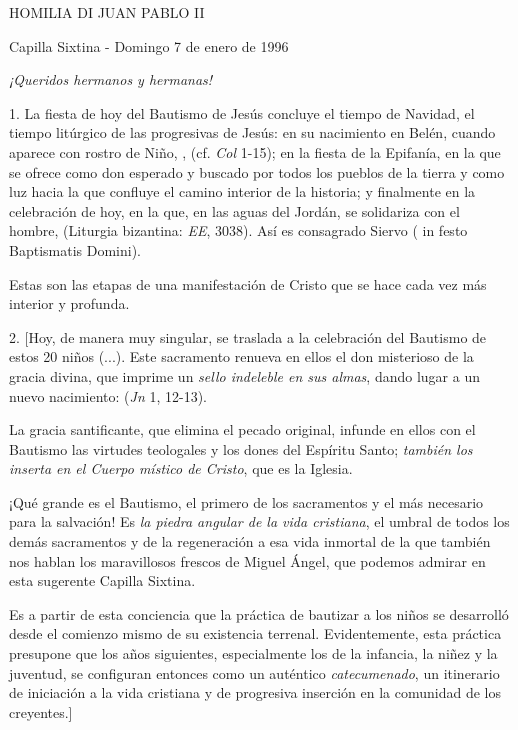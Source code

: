 \begin{body}
	HOMILIA DI JUAN PABLO II
	
	Capilla Sixtina - Domingo 7 de enero de 1996
	
	\emph{¡Queridos hermanos y hermanas!}
	
	1. La fiesta de hoy del Bautismo de Jesús concluye el tiempo de Navidad, el tiempo litúrgico de las progresivas  de Jesús: en su nacimiento en Belén, cuando aparece con rostro de Niño, ,  (cf. \emph{Col} 1-15); en la fiesta de la Epifanía, en la que se ofrece como don esperado y buscado por todos los pueblos de la tierra y como luz hacia la que confluye el camino interior de la historia; y finalmente en la celebración de hoy, en la que, en las aguas del Jordán, se solidariza con el hombre,  (Liturgia bizantina: \emph{EE}, 3038). Así es consagrado Siervo  ( in festo Baptismatis Domini).
	
	Estas son las etapas de una manifestación de Cristo que se hace cada vez más interior y profunda.
	
	2. {[}Hoy, de manera muy singular, se traslada a la celebración del Bautismo de estos 20 niños (...). Este sacramento renueva en ellos el don misterioso de la gracia divina, que imprime un \emph{sello indeleble en sus almas}, dando lugar a un nuevo nacimiento:  (\emph{Jn} 1, 12-13).
	
	La gracia santificante, que elimina el pecado original, infunde en ellos con el Bautismo las virtudes teologales y los dones del Espíritu Santo; \emph{también los inserta en el Cuerpo místico de Cristo}, que es la Iglesia.
	
	¡Qué grande es el Bautismo, el primero de los sacramentos y el más necesario para la salvación! Es \emph{la piedra angular de la vida cristiana}, el umbral de todos los demás sacramentos y de la regeneración a esa vida inmortal de la que también nos hablan los maravillosos frescos de Miguel Ángel, que podemos admirar en esta sugerente Capilla Sixtina.
	
	Es a partir de esta conciencia que la práctica de bautizar a los niños se desarrolló desde el comienzo mismo de su existencia terrenal. Evidentemente, esta práctica presupone que los años siguientes, especialmente los de la infancia, la niñez y la juventud, se configuran entonces como un auténtico \emph{catecumenado}, un itinerario de iniciación a la vida cristiana y de progresiva inserción en la comunidad de los creyentes.{]}
	

\end{body}
